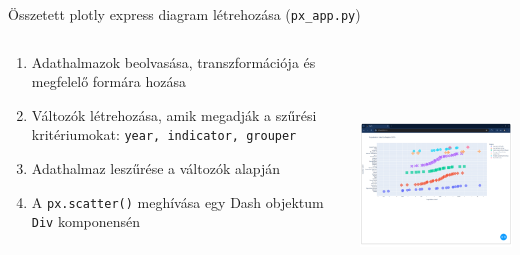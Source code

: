 \documentclass[english, aspectratio=169]{beamer}
\begin{document}
\begin{frame}{Összetett plotly express diagram létrehozása (\texttt{px\_app.py})}
	\begin{columns}
		\begin{column}{.5\textwidth}
			\begin{enumerate}
				\item Adathalmazok beolvasása, transzformációja és megfelelő formára hozása
				\item Változók létrehozása, amik megadják a szűrési kritériumokat: \texttt{year, indicator, grouper}
				\item Adathalmaz leszűrése a változók alapján
				\item A \texttt{px.scatter()} meghívása egy Dash objektum \texttt{Div} komponensén
			\end{enumerate}
		\end{column}
		\begin{column}{.5\textwidth}
			\begin{center}
				\includegraphics[width=7cm, height=7cm, keepaspectratio]{images/plots_13.png}
			\end{center}
		\end{column} 
	\end{columns}
\end{frame}
\end{document}
